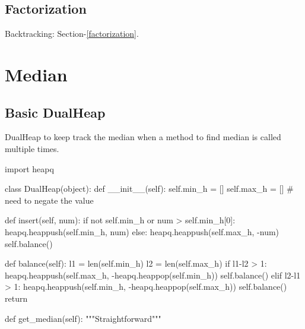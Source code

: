 \subsection{Factorization}
Backtracking: Section-\ref{factorization}.

\section{Median}
\subsection{Basic DualHeap}
DualHeap to keep track the median when a method to find median is called multiple times. \begin{python}
import heapq

class DualHeap(object):
  def __init__(self):
    self.min_h = []
    self.max_h = []  # need to negate the value 

  def insert(self, num):
    if not self.min_h or num > self.min_h[0]:
      heapq.heappush(self.min_h, num)
    else:
      heapq.heappush(self.max_h, -num)
    self.balance()

  def balance(self):
    l1 = len(self.min_h)
    l2 = len(self.max_h)
    if l1-l2 > 1:
      heapq.heappush(self.max_h, 
                     -heapq.heappop(self.min_h))
      self.balance()
    elif l2-l1 > 1:
      heapq.heappush(self.min_h, 
                     -heapq.heappop(self.max_h))
      self.balance()
    return

  def get_median(self):
    """Straightforward"""
\end{python}

